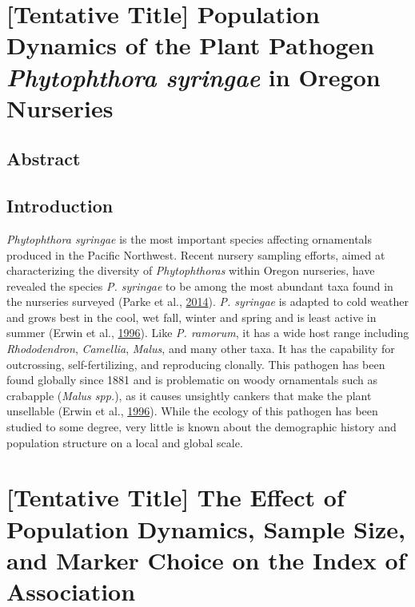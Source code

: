 \documentclass[double,12pt]{beavtex}
\begin{document}
  \chapter{\texorpdfstring{{[}Tentative Title{]} Population Dynamics of
  the Plant Pathogen \emph{Phytophthora syringae} in Oregon
  Nurseries}{{[}Tentative Title{]} Population Dynamics of the Plant Pathogen Phytophthora syringae in Oregon Nurseries}}\label{tentative-title-population-dynamics-of-the-plant-pathogen-phytophthora-syringae-in-oregon-nurseries}
  
  \section{Abstract}\label{abstract-3}
  
  \section{Introduction}\label{introduction-3}
  
  \emph{Phytophthora syringae} is the most important species affecting
  ornamentals produced in the Pacific Northwest. Recent nursery sampling
  efforts, aimed at characterizing the diversity of \emph{Phytophthoras}
  within Oregon nurseries, have revealed the species \emph{P. syringae} to
  be among the most abundant taxa found in the nurseries surveyed (Parke
  et al., \protect\hyperlink{ref-parke2014phytophthora}{2014}). \emph{P.
  syringae} is adapted to cold weather and grows best in the cool, wet
  fall, winter and spring and is least active in summer (Erwin et al.,
  \protect\hyperlink{ref-erwin1996phytophthora}{1996}). Like \emph{P.
  ramorum}, it has a wide host range including \emph{Rhododendron},
  \emph{Camellia}, \emph{Malus}, and many other taxa. It has the
  capability for outcrossing, self-fertilizing, and reproducing clonally.
  This pathogen has been found globally since 1881 and is problematic on
  woody ornamentals such as crabapple (\emph{Malus spp.}), as it causes
  unsightly cankers that make the plant unsellable (Erwin et al.,
  \protect\hyperlink{ref-erwin1996phytophthora}{1996}). While the ecology
  of this pathogen has been studied to some degree, very little is known
  about the demographic history and population structure on a local and
  global scale.
  
  \chapter{{[}Tentative Title{]} The Effect of Population Dynamics, Sample
  Size, and Marker Choice on the Index of
  Association}\label{tentative-title-the-effect-of-population-dynamics-sample-size-and-marker-choice-on-the-index-of-association}
  
\end{document}
